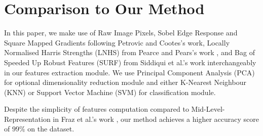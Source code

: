\section{Comparison to Our Method}

In this paper, we make use of 
Raw Image Pixels, Sobel Edge Response and Square Mapped Gradients following Petrovic and Cootes's \citep{petrovic2004analysis} work, 
Locally Normalised Harris Strengths (LNHS) from Pearce and Pears's work \citep{pearce2011automatic}, and 
Bag of Speeded Up Robust Features (SURF) from Siddiqui et al.'s work \citep{siddiqui2016real} 
interchangeably in our features extraction module.
We use Principal Component Analysis (PCA) for optional dimensionality reduction module and either 
K-Nearest Neighbour (KNN) or
Support Vector Machine (SVM) for classification module.

Despite the simplicity of features computation compared to Mid-Level-Representation in Fraz et al.'s work \citep{fraz2014mid}, our method achieves a higher accuracy score of $99\%$ on the dataset.






